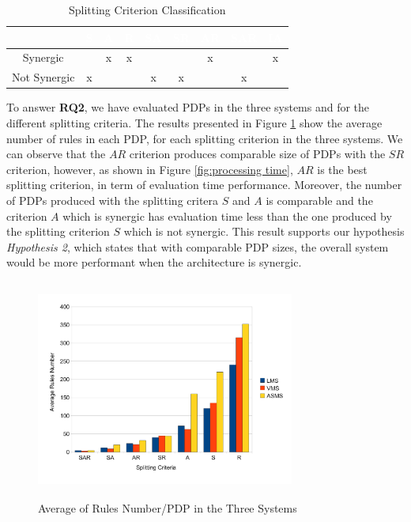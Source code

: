 \begin{table}[t]
\centering
\begin{tabular}{|>{\tiny}c|>{\tiny}c|>{\tiny}c|>{\tiny}c|>{\tiny}c|>{\tiny}c|>{\tiny}c|>{\tiny}c|>{\tiny}c|}   
\hline  \rowcolor{black} \scriptsize \bf \textcolor {white}{}
& \scriptsize \bf \textcolor {white}{S}
& \scriptsize \bf \textcolor {white}{A}
& \scriptsize \bf \textcolor  {white}{R}
& \scriptsize \bf \textcolor  {white}{SA}
& \scriptsize \bf \textcolor  {white}{SR}
& \scriptsize \bf \textcolor  {white}{AR} 
& \scriptsize \bf \textcolor  {white}{SAR}
& \scriptsize \bf \textcolor {white}{IA}\\ \hline
\scriptsize  {Synergic}
&\scriptsize  {}
& \scriptsize {x}
& \scriptsize {x}
& \scriptsize {}
& \scriptsize {}
& \scriptsize {x}
& \scriptsize {}
& \scriptsize {x}
  \\ \hline
\scriptsize  {Not Synergic}
&\scriptsize  {x}
& \scriptsize {}
& \scriptsize {}
& \scriptsize {x}
& \scriptsize {x}
& \scriptsize {}
& \scriptsize {x}
& \scriptsize {}
  \\ \hline
\end{tabular}
\caption{Splitting Criterion Classification}
\label{Classification}
\end{table}

To answer \textbf{RQ2}, we have evaluated PDPs in the three systems and for the different splitting criteria. The results presented in Figure 
\ref{average} show the average number of rules in each PDP, for each splitting criterion in the three systems. We can observe that the $AR$ 
criterion produces comparable size of PDPs with the $SR$ criterion, however, as shown in Figure 
\ref{fig:processing time}, $AR$ is the best splitting criterion, in term of evaluation time performance. 
Moreover, the number of PDPs produced with the splitting critera $S$ and $A$ is comparable and the criterion $A$ which is synergic has evaluation 
time less than the one produced by the splitting criterion $S$ which is not synergic.
This result supports our hypothesis \textit{Hypothesis 2}, which states that with comparable PDP sizes, the overall system would 
be more performant when the architecture is synergic.

\begin{figure}[!h]
\centering
\includegraphics[width=8.5cm, height=7.2cm]{averagerules.pdf}
\begin{center}
\caption{Average of Rules Number/PDP in the Three Systems}
\label{average}
\end{center}
\end{figure}
